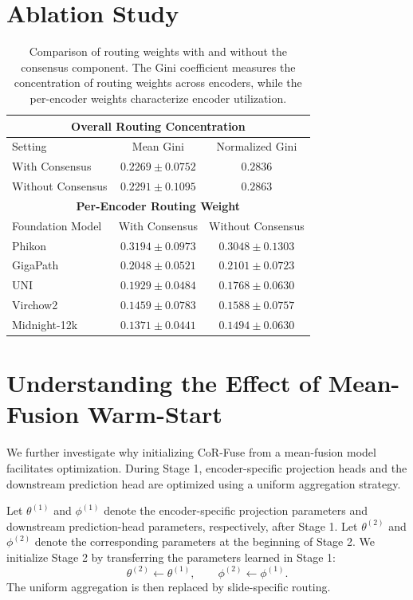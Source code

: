 \section{Ablation Study}
\label{sec:ablation_study}

\begin{table}[!ht]
\centering
\caption{
Comparison of routing weights with and without the consensus component.
The Gini coefficient measures the concentration of routing weights across encoders, while the per-encoder weights characterize encoder utilization.
}
\label{tab:weight_compare_woconsensus}
\begin{tabular}{lcc}
\toprule
\multicolumn{3}{c}{\textbf{Overall Routing Concentration}} \\
\midrule
Setting & Mean Gini & Normalized Gini \\
\midrule
With Consensus    & $0.2269 \pm 0.0752$ & $0.2836$ \\
Without Consensus & $0.2291 \pm 0.1095$ & $0.2863$ \\
\midrule
\multicolumn{3}{c}{\textbf{Per-Encoder Routing Weight}} \\
\midrule
Foundation Model & With Consensus & Without Consensus \\
\midrule
Phikon       & $0.3194 \pm 0.0973$ & $0.3048 \pm 0.1303$ \\
GigaPath     & $0.2048 \pm 0.0521$ & $0.2101 \pm 0.0723$ \\
UNI          & $0.1929 \pm 0.0484$ & $0.1768 \pm 0.0630$ \\
Virchow2     & $0.1459 \pm 0.0783$ & $0.1588 \pm 0.0757$ \\
Midnight-12k & $0.1371 \pm 0.0441$ & $0.1494 \pm 0.0630$ \\
\bottomrule
\end{tabular}
\end{table}

\section{Understanding the Effect of Mean-Fusion Warm-Start}
\label{sec:warm_start}

We further investigate why initializing CoR-Fuse from a mean-fusion model facilitates optimization.
During Stage 1, encoder-specific projection heads and the downstream prediction head are optimized using a uniform aggregation strategy.

Let $\theta^{(1)}$ and $\phi^{(1)}$ denote the encoder-specific projection parameters and downstream prediction-head parameters, respectively, after Stage 1. Let $\theta^{(2)}$ and $\phi^{(2)}$ denote the corresponding parameters at the beginning of Stage 2. We initialize Stage 2 by transferring the parameters learned in Stage 1:
\begin{equation}
\theta^{(2)} \leftarrow \theta^{(1)},
\qquad
\phi^{(2)} \leftarrow \phi^{(1)}.
\end{equation}
The uniform aggregation is then replaced by slide-specific routing.


